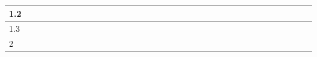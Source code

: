 \begin{table}[]
\begin{tabular}{|l|l|l|l|l|l|l|l|l|l|l|l|l|l|l|l|l|l|l|l|l|l|l|l|l|l|l|l|l|l|l|l|l|l|l|}
    1.2   &                                                 &                          &                          &                          &                          &                          &                          &                          &                          &                          &                          &                          &                          &                          &                          &                          &                          &                          &                          &                          &                          &                          &                          &                          &                          &                          &                          & \cellcolor[HTML]{000000} &                          &                          &                          &                          &                          &                          \\ \hline
    1.3   &                                                 &                          &                          &                          &                          &                          &                          &                          &                          &                          &                          &                          &                          &                          &                          &                          &                          &                          &                          &                          &                          &                          &                          &                          &                          &                          &                          & \cellcolor[HTML]{000000} & \cellcolor[HTML]{000000} &                          &                          &                          &                          &                          \\ \hline
    2     & \cellcolor[HTML]{000000}                        & \cellcolor[HTML]{000000} & \cellcolor[HTML]{000000} &                          &                          &                          & \cellcolor[HTML]{000000} &                          &                          &                          & \cellcolor[HTML]{000000} & \cellcolor[HTML]{000000} &                          & \cellcolor[HTML]{000000} & \cellcolor[HTML]{000000} &                          & \cellcolor[HTML]{000000} & \cellcolor[HTML]{000000} &                          & \cellcolor[HTML]{000000} & \cellcolor[HTML]{000000} & \cellcolor[HTML]{000000} & \cellcolor[HTML]{000000} &                          & \cellcolor[HTML]{000000} & \cellcolor[HTML]{000000} & \cellcolor[HTML]{000000} & \cellcolor[HTML]{000000} & \cellcolor[HTML]{000000} & \cellcolor[HTML]{000000} &                          &                          & \cellcolor[HTML]{000000} &                          \\ \hline

\end{tabular}
\end{table}
